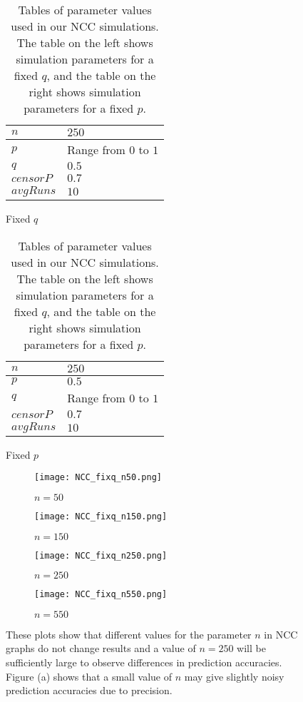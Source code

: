 \begin{table}[h!]
\centering
\begin{subfigure}[h]{0.4\linewidth}
\begin{tabular}{|l|l|}
\hline
$n$ & $250$ \\ \hline
$p$ & Range from $0$ to $1$\\ \hline
$q$ & $0.5$\\ \hline
$censorP$ & $0.7$\\ \hline
$avgRuns$ & $10$\\ \hline
\end{tabular}
\caption{Fixed $q$}
\end{subfigure}
\hfill
\begin{subfigure}[h]{0.4\linewidth}
\begin{tabular}{|l|l|}
\hline
$n$ & $250$ \\ \hline
$p$ & $0.5$\\ \hline
$q$ & Range from $0$ to $1$\\ \hline
$censorP$ & $0.7$\\ \hline
$avgRuns$ & $10$\\ \hline
\end{tabular}
\caption{Fixed $p$}
\end{subfigure}%
\caption{Tables of parameter values used in our NCC simulations. The table
on the left shows simulation parameters for a fixed $q$, and the table on
the right shows simulation parameters for a fixed $p$.}
\label{table:NCC-params}
\end{table}

\begin{figure}[h!]
\begin{subfigure}[h]{0.5\linewidth}
\texttt{[image: NCC\_fixq\_n50.png]}
\caption{$n = 50$}
\end{subfigure}
\hfill
\begin{subfigure}[h]{0.5\linewidth}
\texttt{[image: NCC\_fixq\_n150.png]}
\caption{$n = 150$}
\end{subfigure}
\hfill
\begin{subfigure}[h]{0.5\linewidth}
\texttt{[image: NCC\_fixq\_n250.png]}
\caption{$n = 250$}
\end{subfigure}
\hfill
\begin{subfigure}[h]{0.5\linewidth}
\texttt{[image: NCC\_fixq\_n550.png]}
\caption{$n = 550$}
\end{subfigure}%
\caption{These plots show that different values for the parameter $n$ in NCC graphs do not change results and a value of $n=250$ will be sufficiently large to observe differences in prediction accuracies. Figure (a) shows that a small value of $n$ may give slightly noisy prediction accuracies due to precision.}
\label{fig:NCC_n}
\end{figure}

